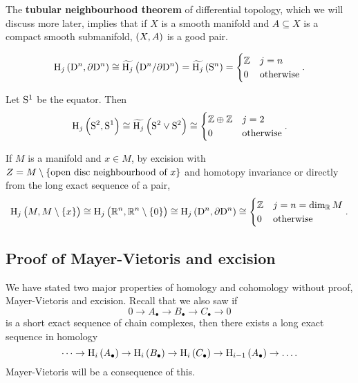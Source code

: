 \begin{remark*}
The \textbf{tubular neighbourhood theorem} of differential topology, which we will discuss more later, implies that if $ X $ is a smooth manifold and $ A \subseteq X $ is a compact smooth submanifold, $ \br{X, A} $ is a good pair.
\end{remark*}

\begin{example*}
$$ \H_j\br{\D^n, \da\D^n} \cong \widetilde{\H_j}\br{\D^n / \da\D^n} = \widetilde{\H_j}\br{\S^n} =
\begin{cases}
\ZZ & j = n \\
0 & \text{otherwise}
\end{cases}.
$$
\end{example*}

\begin{example*}
Let $ \S^1 $ be the equator. Then
$$ \H_j\br{\S^2, \S^1} \cong \widetilde{\H_j}\br{\S^2 \vee \S^2} \cong
\begin{cases}
\ZZ \oplus \ZZ & j = 2 \\
0 & \text{otherwise}
\end{cases}.
$$
\end{example*}

\begin{remark*}
If $ M $ is a manifold and $ x \in M $, by excision with $ Z = M \setminus \cbr{\text{open disc neighbourhood of} \ x} $ and homotopy invariance or directly from the long exact sequence of a pair,
$$ \H_j\br{M, M \setminus \cbr{x}} \cong \H_j\br{\RR^n, \RR^n \setminus \cbr{0}} \cong \H_j\br{\D^n, \da\D^n} \cong
\begin{cases}
\ZZ & j = n = \dim_\RR M \\
0 & \text{otherwise}
\end{cases}.
$$
\end{remark*}

\pagebreak

\subsection{Proof of Mayer-Vietoris and excision}


We have stated two major properties of homology and cohomology without proof, Mayer-Vietoris and excision. Recall that we also saw if
$$ 0 \to A_\bullet \to B_\bullet \to C_\bullet \to 0 $$
is a short exact sequence of chain complexes, then there exists a long exact sequence in homology
$$ \dots \to \H_i\br{A_\bullet} \to \H_i\br{B_\bullet} \to \H_i\br{C_\bullet} \to \H_{i - 1}\br{A_\bullet} \to \dots. $$
Mayer-Vietoris will be a consequence of this.

